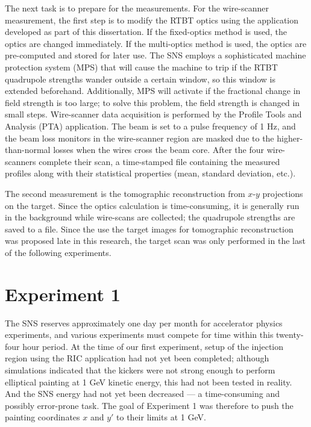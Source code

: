 The next task is to prepare for the measurements. For the wire-scanner measurement, the first step is to modify the RTBT optics using the application developed as part of this dissertation. If the fixed-optics method is used, the optics are changed immediately. If the multi-optics method is used, the optics are pre-computed and stored for later use. The SNS employs a sophisticated machine protection system (MPS) that will cause the machine to trip if the RTBT quadrupole strengths wander outside a certain window, so this window is extended beforehand. Additionally, MPS will activate if the fractional change in field strength is too large; to solve this problem, the field strength is changed in small steps. Wire-scanner data acquisition is performed by the Profile Tools and Analysis (PTA) application. The beam is set to a pulse frequency of 1 Hz, and the beam loss monitors in the wire-scanner region are masked due to the higher-than-normal losses when the wires cross the beam core. After the four wire-scanners complete their scan, a time-stamped file containing the measured profiles along with their statistical properties (mean, standard deviation, etc.). 

The second measurement is the tomographic reconstruction from $x$-$y$ projections on the target. Since the optics calculation is time-consuming, it is generally run in the background while wire-scans are collected; the quadrupole strengths are saved to a file. Since the use the target images for tomographic reconstruction was proposed late in this research, the target scan was only performed in the last of the following experiments.


\section{Experiment 1}

The SNS reserves approximately one day per month for accelerator physics experiments, and various experiments must compete for time within this twenty-four hour period. At the time of our first experiment, setup of the injection region using the RIC application had not yet been completed; although simulations indicated that the kickers were not strong enough to perform elliptical painting at 1 GeV kinetic energy, this had not been tested in reality. And the SNS energy had not yet been decreased — a time-consuming and possibly error-prone task. The goal of Experiment 1 was therefore to push the painting coordinates $x$ and $y'$ to their limits at 1 GeV.

